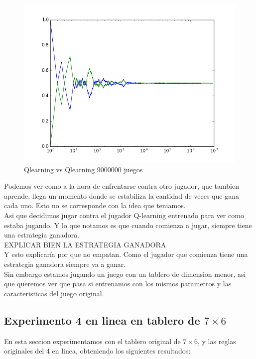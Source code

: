 \begin{figure}[h]
 \centering
 \begin{minipage}{.45\textwidth}
	\centering
	\includegraphics[scale=0.35]{img/QlearningQlearningEgreedy9000000.png}
        \caption{Qlearning vs Qlearning 9000000 juegos}
  \end{minipage}
\end{figure}


Podemos ver como a la hora de enfrentarse contra otro jugador, que tambien aprende, llega un momento donde se estabiliza la
 cantidad de veces que gana cada uno. Esto no se corresponde con la idea que teniamos. \\

Asi que decidimos jugar contra el jugador Q-learning entrenado para ver como estaba jugando. Y lo que notamos es que cuando comienza
 a jugar, siempre tiene una estrategia ganadora.\\
{\huge EXPLICAR BIEN LA ESTRATEGIA GANADORA}\\

Y esto explicaría por que no empatan. Como el jugador que comienza tiene una estrategia ganadora siempre va a ganar.\\

Sin embargo estamos jugando un juego con un tablero de dimension menor, asi que queremos ver que pasa si entrenamos
 con los mismos parametros y las caracteristicas del juego original.

\subsection{Experimento 4 en linea en tablero de $7\times6$}
En esta seccion experimentamos con el tablero original de $7\times6$, y las reglas originales del 4 en linea, obteniendo
los siguientes resultados:

